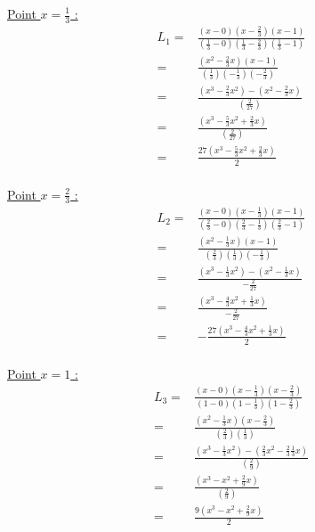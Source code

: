 \documentclass[12pt, letterpaper]{article}
\begin{document}
\begin{enumerate}
\underline{Point $x = \frac{1}{3}$ :}
\begin{equation*}
  \begin{split}
    L_1 = & \frac{(x - 0) (x - \frac{2}{3}) (x - 1)}
    {(\frac{1}{3} - 0 ) (\frac{1}{3} - \frac{2}{3}) (\frac{1}{3} - 1)}
    \\
    = & \frac{(x^2 - \frac{2}{3}x) (x - 1)}
    {(\frac{1}{3}) (- \frac{1}{3}) (- \frac{2}{3})} \\
    = & \frac{(x^3 - \frac{2}{3}x^2) - (x^2 - \frac{2}{3}x)}
    {(\frac{2}{27})} \\
    = & \frac{(x^3 - \frac{5}{3}x^2 + \frac{2}{3}x)}
    {(\frac{2}{27})} \\
    = & \frac{27 (x^3 - \frac{5}{3}x^2 + \frac{2}{3}x)}
    {2} \\
  \end{split}
\end{equation*}


\underline{Point $x = \frac{2}{3}$ :}
\begin{equation*}
  \begin{split}
    L_2 = & \frac{(x - 0) (x - \frac{1}{3}) (x - 1)}
    {(\frac{2}{3} - 0 ) (\frac{2}{3} - \frac{1}{3}) (\frac{2}{3} - 1)}
    \\
    = & \frac{(x^2 - \frac{1}{3}x) (x - 1)}
    {(\frac{2}{3}) (\frac{1}{3}) (- \frac{1}{3})}
    \\
    = & \frac{(x^3 - \frac{1}{3}x^2) - (x^2 - \frac{1}{3}x)}
    {- \frac{2}{27}}
    \\
    = & \frac{(x^3 - \frac{4}{3}x^2 + \frac{1}{3}x)}
    {- \frac{2}{27}}
    \\
    = & - \frac{27 (x^3 - \frac{4}{3}x^2 + \frac{1}{3}x)}
    {2}
    \\
  \end{split}
\end{equation*}

\underline{Point $x = 1$ :}
\begin{equation*}
  \begin{split}
    L_3 = & \frac{(x - 0) (x - \frac{1}{3}) (x - \frac{2}{3})}
    {(1 - 0 ) (1 - \frac{1}{3}) (1 - \frac{2}{3})}
    \\
    = & \frac{(x^2 - \frac{1}{3} x) (x - \frac{2}{3})}
    {(\frac{2}{3}) (\frac{1}{3})}
    \\
    = & \frac{(x^3 - \frac{1}{3} x^2) - (\frac{2}{3}x^2 - \frac{2}{3}\frac{1}{3} x)}
    {(\frac{2}{9})}
    \\
    = & \frac{(x^3 - x^2 + \frac{2}{9} x)}
    {(\frac{2}{9})}
    \\
    = & \frac{ 9 (x^3 - x^2 + \frac{2}{9} x)}
    {2}
    \\
  \end{split}
\end{equation*}


\end{enumerate}
\end{document}
